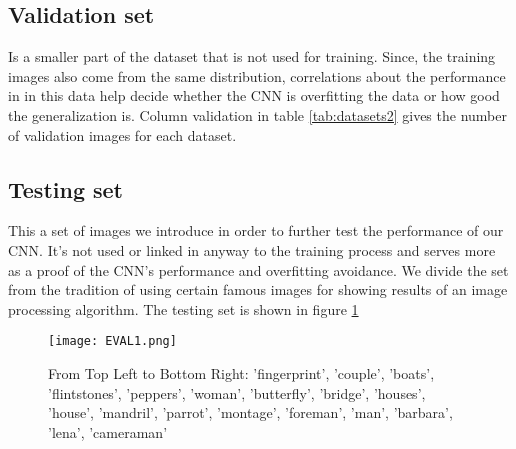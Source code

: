 \FloatBarrier

\subsection{Validation set}
Is a smaller part of the dataset that is not used for training. Since, the training images also come from the same distribution, correlations about the performance in in this data help decide whether the CNN is overfitting the data or how good the generalization is. Column validation in table \ref{tab:datasets2}  gives the number of validation images for each dataset. 

\FloatBarrier

\subsection{Testing set}
This a set of images we introduce in order to further test the performance of our CNN. It's not used or linked in anyway to the training process and serves more as a proof of the CNN's performance and overfitting avoidance. We divide the set from the tradition of using certain famous images for showing results of an image processing algorithm. The testing set is shown in figure \ref{fig:EVALim1}

\begin{figure}[!htb]
\centering 
\texttt{[image: EVAL1.png]} 
\caption[Evaluation images]{From Top Left to Bottom Right: 'fingerprint', 'couple', 'boats', 'flintstones', 'peppers', 'woman', 'butterfly', 'bridge', 'houses', 'house', 'mandril', 'parrot', 'montage', 'foreman', 'man', 'barbara', 'lena', 'cameraman'}
\label{fig:EVALim1} 
\end{figure}

\FloatBarrier

